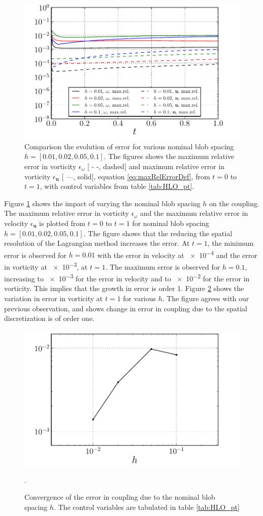 	\begin{figure}[!h]
	\centering
	\includegraphics[width=0.6\linewidth]{./figures/hybrid/lambOseen/lambOseen_parameter_h.pdf}
	\caption{Comparison the evolution of error for various nominal blob spacing $h = [0.01,0.02,0.05,0.1]$. The figures shows the maximum relative error in vorticity $\epsilon_{\omega}$ [ - -, dashed] and maximum relative error in vorticity $\epsilon_{\mathbf{u}}$ [ ---, solid], equation \ref{eq:maxRelErrorDef}, from $t=0$ to $t=1$, with control variables from table \ref{tab:HLO_pt}.}
	\label{fig:lambOseen_parameter_h}
	\end{figure}	
	
Figure \ref{fig:lambOseen_parameter_h} shows the impact of varying the nominal blob spacing $h$ on the coupling. The maximum relative error in vorticity $\epsilon_{\omega}$ and the maximum relative error in velocity $\epsilon_{\mathbf{u}}$ is plotted from $t=0$ to $t=1$ for nominal blob spacing $h = [0.01,0.02,0.05,0.1]$. The figure shows that the reducing the spatial resolution of the Lagrangian method increases the error. At $t=1$, the minimum error is observed for $h=0.01$ with the error in velocity at \num{e-4} and the error in vorticity at \num{e-3}, at $t=1$. The maximum error is observed for $h=0.1$, increasing to \num{e-3} for the error in velocity and to \num{e-2} for the error in vorticity. This implies that the growth in error is order 1. Figure \ref{fig:lambOseen_parameter_h_Trend} shows the variation in error in vorticity at $t=1$ for various $h$. The figure agrees with our previous observation, and shows change in error in coupling due to the spatial discretization is of order one.

	\begin{figure}[!h]
	\centering
	\includegraphics[width=0.6\linewidth]{./figures/hybrid/lambOseen/lambOseen_parameter_h_Trend.pdf}
	\caption{Convergence of the error in coupling due to the nominal blob spacing $h$. The control variables are tabulated in table \ref{tab:HLO_pt}}.
	\label{fig:lambOseen_parameter_h_Trend}
	\end{figure}	

